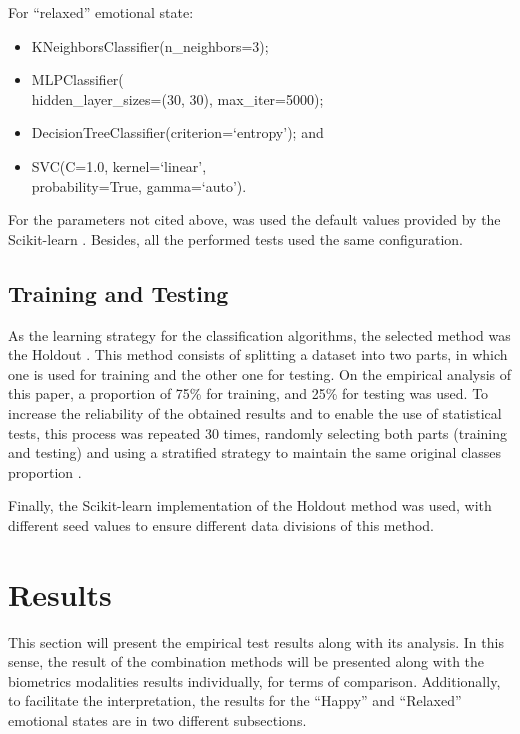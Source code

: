 \documentclass[conference]{IEEEtran}
\begin{document}
For ``relaxed'' emotional state:

\begin{itemize}
    \item KNeighborsClassifier(n\_neighbors=3);
    \item MLPClassifier(\\hidden\_layer\_sizes=(30, 30), max\_iter=5000);
    \item DecisionTreeClassifier(criterion=`entropy'); and
    \item SVC(C=1.0, kernel=`linear', \\probability=True, gamma=`auto').
\end{itemize}

For the parameters not cited above, was used the default values provided by the Scikit-learn \cite{sklearn}. Besides, all the performed tests used the same configuration.

\subsection{Training and Testing}

As the learning strategy for the classification algorithms, the selected method was the Holdout \cite{validation}. This method consists of splitting a dataset into two parts, in which one is used for training and the other one for testing. On the empirical analysis of this paper, a proportion of 75\% for training, and 25\% for testing was used. 
To increase the reliability of the obtained results and to enable the use of statistical tests, this process was repeated 30 times, randomly selecting both parts (training and testing) and using a stratified strategy to maintain the same original classes proportion \cite{faceli}.

Finally, the Scikit-learn implementation of the Holdout method was used, with different seed values to ensure different data divisions of this method. 


\section{Results}

This section will present the empirical test results along with its analysis. 
In this sense, the result of the combination methods will be presented along with the biometrics modalities results individually, for terms of comparison. 
Additionally, to facilitate the interpretation, the results for the ``Happy'' and ``Relaxed'' emotional states are in two different subsections.
\end{document}
